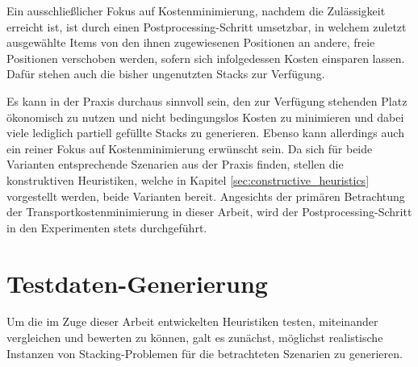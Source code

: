 Ein ausschließlicher Fokus auf Kostenminimierung, nachdem die Zulässigkeit erreicht ist, ist durch
einen Postprocessing-Schritt umsetzbar, in welchem zuletzt ausgewählte Items von den ihnen zugewiesenen Positionen
an andere, freie Positionen verschoben werden, sofern sich infolgedessen Kosten einsparen lassen.
Dafür stehen auch die bisher ungenutzten Stacks zur Verfügung.

Es kann in der Praxis durchaus sinnvoll sein, den zur Verfügung stehenden Platz ökonomisch zu nutzen
und nicht bedingungslos Kosten zu minimieren und dabei viele lediglich partiell gefüllte Stacks zu generieren.
Ebenso kann allerdings auch ein reiner Fokus auf Kostenminimierung erwünscht sein. Da sich für beide Varianten
entsprechende Szenarien aus der Praxis finden, stellen die konstruktiven Heuristiken,
welche in Kapitel \ref{sec:constructive_heuristics} vorgestellt werden, beide Varianten bereit.
Angesichts der primären Betrachtung der Transportkostenminimierung in dieser Arbeit,
wird der Postprocessing-Schritt in den Experimenten stets durchgeführt.

\section{Testdaten-Generierung}
\label{sec:test_data}

Um die im Zuge dieser Arbeit entwickelten Heuristiken testen, miteinander vergleichen
und bewerten zu können, galt es zunächst, möglichst realistische Instanzen von Stacking-Problemen
für die betrachteten Szenarien zu generieren.

